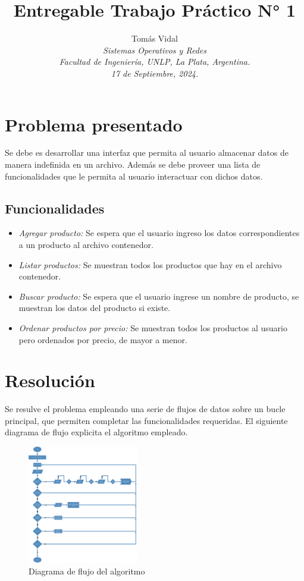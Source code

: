 \documentclass[letterpaper, 10 pt, conference]{ieeeconf}  %
\title{\LARGE \bf Entregable Trabajo Práctico N° 1}
\author{
  Tom\'as Vidal\\
  {\it Sistemas Operativos y Redes}\\
  {\it Facultad de Ingenier\'ia, UNLP, La Plata, Argentina.}\\
  {\it 17 de Septiembre, 2024.}
}                                            %
\begin{document}
\maketitle
\thispagestyle{empty}
\pagestyle{empty}

\section{Problema presentado}
Se debe es desarrollar una interfaz que permita al usuario almacenar datos de manera indefinida en un archivo. Además se debe proveer una lista de funcionalidades que le permita al usuario interactuar con dichos datos.

\subsection{Funcionalidades}
\begin{itemize}
  \item \textit{Agregar producto:} Se espera que el usuario ingreso los datos correspondientes a un producto al archivo contenedor.
  \item \textit{Listar productos:} Se muestran todos los productos que hay en el archivo contenedor.
  \item \textit{Buscar producto:} Se espera que el usuario ingrese un nombre de producto, se muestran los datos del producto si existe.
  \item \textit{Ordenar productos por precio:} Se muestran todos los productos al usuario pero ordenados por precio, de mayor a menor.
\end{itemize}

\section{Resolución}
Se resulve el problema empleando una serie de flujos de datos sobre un bucle principal, que permiten completar las funcionalidades requeridas. El siguiente diagrama de flujo explicita el algoritmo empleado.
\begin{figure}[H]
  \centering
  \includegraphics[width=0.43\textwidth]{./diagrama_flujo_tp1.png}
  \caption{Diagrama de flujo del algoritmo}
  \label{img:diag_flujo}
\end{figure}
\end{document}
